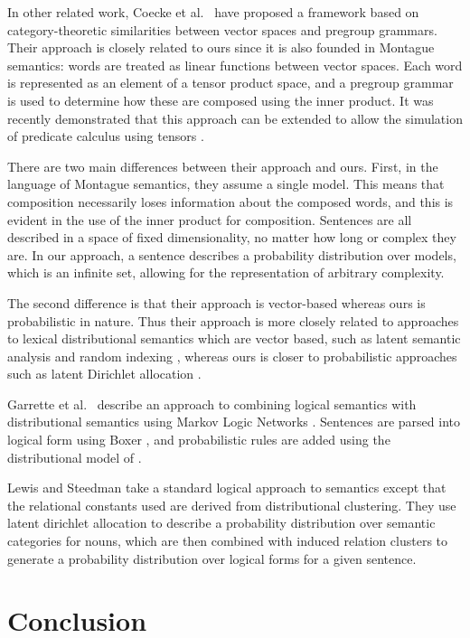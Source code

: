 \documentclass[11pt]{article}
\theoremstyle{definition}
\begin{document}
In other related work, Coecke et al.~\cite{Coecke:10} have proposed a framework based on category-theoretic
similarities between vector spaces and pregroup grammars. Their
approach is closely related to ours since it is also
founded in Montague semantics: words are treated as linear functions
between vector spaces. Each word is represented as an element of a
tensor product space, and a pregroup grammar is used to determine how
these are composed using the inner product. It was recently
demonstrated that this approach can be extended to allow the
simulation of predicate calculus using
tensors \cite{Grefenstette:13}.

There are two main differences between their approach and ours. First,
in the language of Montague semantics, they assume a single
model. This means that composition necessarily loses information about
the composed words, and this is evident in the use of the inner
product for composition. Sentences are all described in a space of
fixed dimensionality, no matter how long or complex they are. In our
approach, a sentence describes a probability distribution over models,
which is an infinite set, allowing for the representation of arbitrary
complexity.

The second difference is that their approach is vector-based whereas
ours is probabilistic in nature. Thus their approach is more
closely related to approaches to lexical distributional semantics
which are vector based, such as latent semantic analysis
\cite{Deerwester:90} and random indexing \cite{Sahlgren:02}, whereas
ours is closer to probabilistic approaches such as latent Dirichlet
allocation \cite{Blei:03}.

Garrette et al.~\cite{Garrette:11} describe an approach to combining logical
semantics with distributional semantics using Markov Logic Networks
\cite{Richardson:06}. Sentences are parsed into logical form using
Boxer \cite{Bos:04}, and probabilistic rules are added using the
distributional model of \cite{Erk:10}.

Lewis and Steedman \cite{Lewis:13} take a standard logical approach to
semantics except that the relational constants used are derived from
distributional clustering. They use latent dirichlet allocation to
describe a probability distribution over semantic categories for
nouns, which are then combined with induced relation clusters to
generate a probability distribution over logical forms for a given
sentence.

\section{Conclusion}
\end{document}
